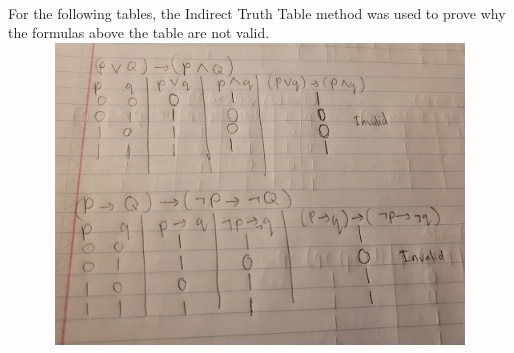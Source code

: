 \documentclass{article}
\theoremstyle{theorem}
\theoremstyle{definition}
\theoremstyle{remark}
\begin{document}
\\
For the following tables, the Indirect Truth Table method was used to prove why the formulas above the table are not valid.
\\ \includegraphics[width=15cm, height=8cm]{Report Images/HW6_4.jpg}
\end{document}

